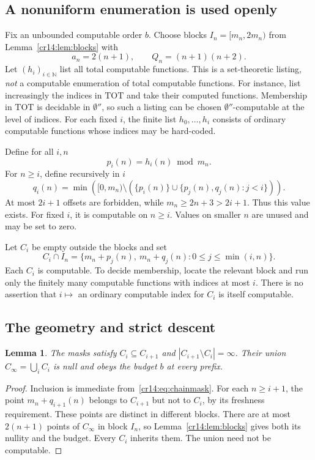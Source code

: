 \documentclass[11pt,a4paper]{article}
\newcommand{\N}{\mathbb N}
\newcommand{\doublezero}{\emptyset''}
\newtheorem{lemma}[theorem]{Lemma}
\theoremstyle{definition}
\theoremstyle{remark}
\begin{document}
\subsection{A nonuniform enumeration is used openly}
Fix an unbounded computable order $b$. Choose blocks $I_n=[m_n,2m_n)$
from Lemma~\ref{cr14:lem:blocks} with
\[
 a_n=2(n+1),\qquad Q_n=(n+1)(n+2).
\]
Let $(h_i)_{i\in\N}$ list all total computable functions. This is a
set-theoretic listing, \emph{not} a computable enumeration of total
computable functions. For instance, list increasingly the indices in
$\mathrm{TOT}$ and take their computed functions. Membership in
$\mathrm{TOT}$ is decidable in $\doublezero$, so such a listing can be
chosen $\doublezero$-computable at the level of indices. For each fixed
$i$, the finite list $h_0,\ldots,h_i$ consists of ordinary computable
functions whose indices may be hard-coded.

Define for all $i,n$
\[
 p_i(n)=h_i(n)\bmod m_n.
\]
For $n\geq i$, define recursively in $i$
\begin{equation}\label{cr14:eq:fresh}
 q_i(n)=\min\left([0,m_n)\setminus
      \left(\{p_i(n)\}\cup\{p_j(n),q_j(n):j<i\}\right)\right).
\end{equation}
At most $2i+1$ offsets are forbidden, while $m_n\geq2n+3>2i+1$.
Thus this value exists. For fixed $i$, it is computable on $n\geq i$.
Values on smaller $n$ are unused and may be set to zero.

Let $C_i$ be empty outside the blocks and set
\begin{equation}\label{cr14:eq:chainmask}
 C_i\cap I_n=
 \{m_n+p_j(n),\ m_n+q_j(n):0\leq j\leq\min(i,n)\}.
\end{equation}
Each $C_i$ is computable. To decide membership, locate the relevant block
and run only the finitely many computable functions with indices at most
$i$. There is no assertion that $i\mapsto$ an ordinary computable index
for $C_i$ is itself computable.

\subsection{The geometry and strict descent}
\begin{lemma}\label{cr14:lem:chaingeometry}
The masks satisfy $C_i\subseteq C_{i+1}$ and
$|C_{i+1}\setminus C_i|=\infty$. Their union
$C_\infty=\bigcup_i C_i$ is null and obeys the budget $b$ at every prefix.
\end{lemma}
\begin{proof}
Inclusion is immediate from~\eqref{cr14:eq:chainmask}. For each $n\geq i+1$,
the point $m_n+q_{i+1}(n)$ belongs to $C_{i+1}$ but not to $C_i$, by
its freshness requirement. These points are distinct in different blocks.
There are at most $2(n+1)$ points of $C_\infty$ in block $I_n$, so
Lemma~\ref{cr14:lem:blocks} gives both its nullity and the budget. Every $C_i$
inherits them. The union need not be computable.
\end{proof}
\end{document}
